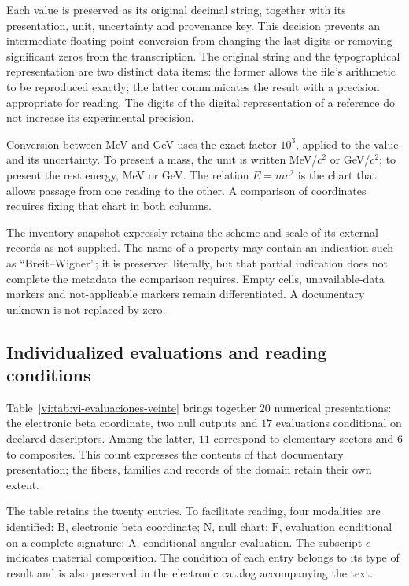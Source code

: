 Each value is preserved as its original decimal string, together with its
presentation, unit, uncertainty and provenance key. This decision
prevents an intermediate floating-point conversion from changing the last
digits or removing significant zeros from the transcription. The original
string and the typographical representation are two distinct data items: the
former allows the file's arithmetic to be reproduced exactly; the
latter communicates the result with a precision appropriate for reading.
The digits of the digital representation of a reference do not increase its
experimental precision.

Conversion between MeV and GeV uses the exact factor \(10^3\), applied
to the value and its uncertainty. To present a mass, the unit is written
MeV/\(c^2\) or GeV/\(c^2\); to present the rest energy,
MeV or GeV. The relation \(E=mc^2\) is the chart that allows passage from one
reading to the other. A comparison of coordinates requires fixing that chart in
both columns.

The inventory snapshot expressly retains the scheme and scale of its external
records as not supplied. The name of a property
may contain an indication such as ``Breit--Wigner''; it is preserved literally,
but that partial indication does not complete the metadata the comparison
requires. Empty cells, unavailable-data markers and
not-applicable markers remain differentiated. A documentary unknown
is not replaced by zero.

\subsection{Individualized evaluations and reading conditions}
\label{vi:subsec:vi-evaluaciones-documentadas}

Table~\ref{vi:tab:vi-evaluaciones-veinte} brings together \(20\) numerical
presentations: the electronic beta coordinate, two null outputs and
\(17\) evaluations conditional on declared descriptors. Among
the latter, \(11\) correspond to elementary sectors and \(6\) to
composites. This count expresses the contents of that documentary presentation;
the fibers, families and records of the domain retain their own extent.

The table retains the twenty entries. To facilitate reading,
four modalities are identified: \(\mathrm{B}\), electronic beta
coordinate; \(\mathrm{N}\), null chart; \(\mathrm{F}\), evaluation
conditional on a complete signature; \(\mathrm{A}\), conditional angular
evaluation. The subscript \(c\) indicates material composition. The
condition of each entry belongs to its type of result and is also
preserved in the electronic catalog accompanying the text.

